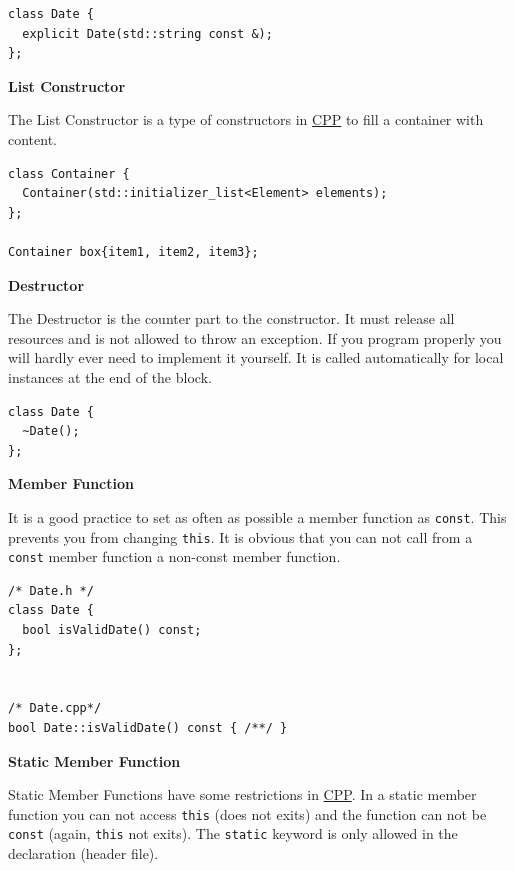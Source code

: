 \documentclass[11pt,twoside,landscape]{article}
\begin{document}
\begin{multicols}{3}
\lstset{language=c++,label= ,caption= ,captionpos=b,numbers=none}
\begin{lstlisting}
class Date {
  explicit Date(std::string const &);
};
\end{lstlisting}

\textbf{List Constructor}

The List Constructor is a type of constructors in \href{../../../roam/20210920103243-c.org}{CPP} to fill a container with content.

\lstset{language=c++,label= ,caption= ,captionpos=b,numbers=none}
\begin{lstlisting}
class Container {
  Container(std::initializer_list<Element> elements);
};

Container box{item1, item2, item3};
\end{lstlisting}

\textbf{Destructor}

The Destructor is the counter part to the constructor.
It must release all resources and is not allowed to throw an exception.
If you program properly you will hardly ever need to implement it yourself.
It is called automatically for local instances at the end of the block.

\lstset{language=c++,label= ,caption= ,captionpos=b,numbers=none}
\begin{lstlisting}
class Date {
  ~Date();
};
\end{lstlisting}

\textbf{Member Function}

It is a good practice to set as often as possible a member function as \texttt{const}.
This prevents you from changing \texttt{this}.
It is obvious that you can not call from a \texttt{const} member function a non-const member function.

\lstset{language=c++,label= ,caption= ,captionpos=b,numbers=none}
\begin{lstlisting}
/* Date.h */
class Date {
  bool isValidDate() const;
};


/* Date.cpp*/
bool Date::isValidDate() const { /**/ }
\end{lstlisting}

\textbf{Static Member Function}

Static Member Functions have some restrictions in \href{../../../roam/20210920103243-c.org}{CPP}.
In a static member function you can not access \texttt{this} (does not exits) and the function can not be \texttt{const} (again, \texttt{this} not exits).
The \texttt{static} keyword is only allowed in the declaration (header file).


\end{multicols}
\end{document}
